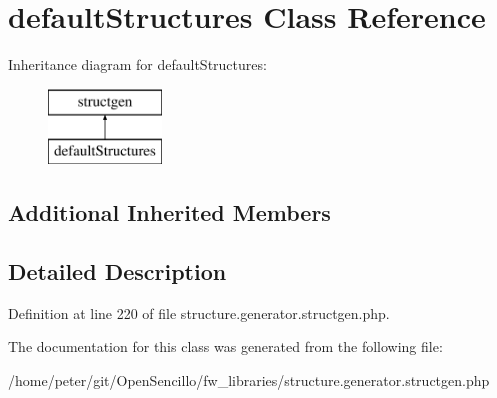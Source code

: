 \hypertarget{classdefault_structures}{\section{default\-Structures Class Reference}
\label{classdefault_structures}
}
Inheritance diagram for default\-Structures\-:\begin{figure}[H]
\begin{center}
\leavevmode
\includegraphics[height=2.000000cm]{classdefault_structures}
\end{center}
\end{figure}
\subsection*{Additional Inherited Members}


\subsection{Detailed Description}


Definition at line 220 of file structure.\-generator.\-structgen.\-php.



The documentation for this class was generated from the following file\-:\begin{DoxyCompactItemize}
\item 
/home/peter/git/\-Open\-Sencillo/fw\-\_\-libraries/structure.\-generator.\-structgen.\-php\end{DoxyCompactItemize}
